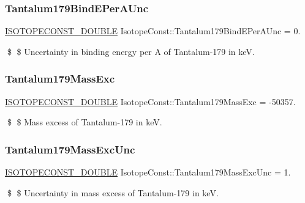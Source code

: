 \subsubsection{\texorpdfstring{Tantalum179\+Bind\+E\+Per\+A\+Unc}{Tantalum179BindEPerAUnc}}
{\footnotesize\ttfamily \mbox{\hyperlink{group___isotope_const-_macros_ga8f45a7272ce02c0b4c65c44636ed719a}{I\+S\+O\+T\+O\+P\+E\+C\+O\+N\+S\+T\+\_\+\+D\+O\+U\+B\+LE}} Isotope\+Const\+::\+Tantalum179\+Bind\+E\+Per\+A\+Unc = 0.}

\$ \$ Uncertainty in binding energy per A of Tantalum-\/179 in keV. \mbox{\label{group___isotope_const-_tantalum-_ta179_gae363f2f651c43e54fcf92f2360a63470}} 
\subsubsection{\texorpdfstring{Tantalum179\+Mass\+Exc}{Tantalum179MassExc}}
{\footnotesize\ttfamily \mbox{\hyperlink{group___isotope_const-_macros_ga8f45a7272ce02c0b4c65c44636ed719a}{I\+S\+O\+T\+O\+P\+E\+C\+O\+N\+S\+T\+\_\+\+D\+O\+U\+B\+LE}} Isotope\+Const\+::\+Tantalum179\+Mass\+Exc = -\/50357.}

\$ \$ Mass excess of Tantalum-\/179 in keV. \mbox{\label{group___isotope_const-_tantalum-_ta179_gace3160ccbbb6bab615f4e600e141ba4b}} 
\subsubsection{\texorpdfstring{Tantalum179\+Mass\+Exc\+Unc}{Tantalum179MassExcUnc}}
{\footnotesize\ttfamily \mbox{\hyperlink{group___isotope_const-_macros_ga8f45a7272ce02c0b4c65c44636ed719a}{I\+S\+O\+T\+O\+P\+E\+C\+O\+N\+S\+T\+\_\+\+D\+O\+U\+B\+LE}} Isotope\+Const\+::\+Tantalum179\+Mass\+Exc\+Unc = 1.}

\$ \$ Uncertainty in mass excess of Tantalum-\/179 in keV. \mbox{\label{group___isotope_const-_tantalum-_ta179_ga784399e1e026fd6213c79d0be01344c0}} 

